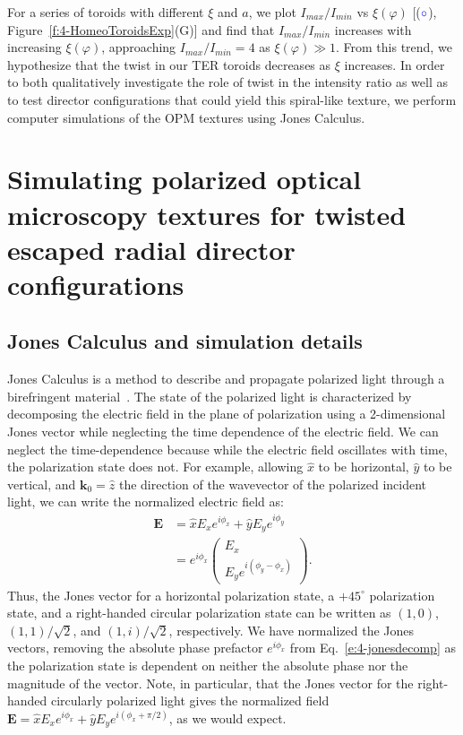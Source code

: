 For a series of toroids with different $\xi$ and $a$, we plot $I_{max}/I_{min}$ vs $\xi(\varphi)$ [(${\color{blue} \circ}$), Figure~\ref{f:4-HomeoToroidsExp}(G)] and find that $I_{max}/I_{min}$ increases with increasing $\xi(\varphi)$, approaching $I_{max}/I_{min} = 4$ as $\xi(\varphi) \gg 1$.
From this trend, we hypothesize that the twist in our TER toroids decreases as $\xi$ increases.
In order to both qualitatively investigate the role of twist in the intensity ratio as well as to test director configurations that could yield this spiral-like texture, we perform computer simulations of the OPM textures using Jones Calculus.




\section{Simulating polarized optical microscopy textures for twisted escaped radial director configurations}
\subsection{Jones Calculus and simulation details}
Jones Calculus is a method to describe and propagate polarized light through a birefringent material~\cite{RN232}.
The state of the polarized light is characterized by decomposing the electric field in the plane of polarization using a 2-dimensional Jones vector while neglecting the time dependence of the electric field.
We can neglect the time-dependence because while the electric field oscillates with time, the polarization state does not.
For example, allowing $\hat{x}$ to be horizontal, $\hat{y}$ to be vertical, and $\mathbf{k}_0 = \hat{z}$ the direction of the wavevector of the polarized incident light, we can write the normalized electric field as:
\begin{align}
\mathbf{E} &=  \hat{x}E_x e^{i \phi _x} + \hat{y} E_y e^{i \phi _y}\\  &= e^{i \phi _x} \left( \begin{array}{c} E_x \\E_y e^{i(\phi _y - \phi _x)}      \end{array} \right). \label{e:4-jonesdecomp}
\end{align}
Thus, the Jones vector for a horizontal polarization state, a $+45^{\circ}$ polarization state, and a right-handed circular polarization state can be written as $(1,0)$, $(1,1)/\sqrt{2}$, and $(1,i)/\sqrt{2}$, respectively.
We have normalized the Jones vectors, removing the absolute phase prefactor $e^{i \phi _x}$ from Eq.~\ref{e:4-jonesdecomp} as the polarization state is dependent on neither the absolute phase nor the magnitude of the vector.
Note, in particular, that the Jones vector for the right-handed circularly polarized light gives the normalized field $\mathbf{E} = \hat{x}E_x e^{i \phi _x} + \hat{y} E_y e^{i( \phi _x+\pi/2)}$, as we would expect.

